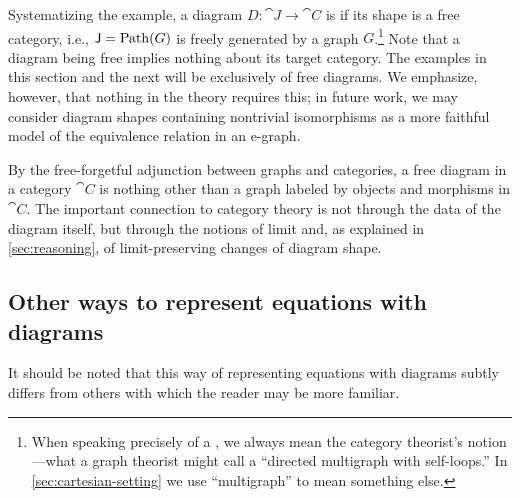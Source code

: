 \documentclass[11pt]{article}
\numberwithin{equation}{section}
\begin{document}
Systematizing the example, a diagram $D: \cat{J} \to \cat{C}$ is 
if its shape is a free category, i.e., $\mathsf{J} = \operatorname{Path}(G)$ is freely generated
by a graph $G$.\footnote{When speaking precisely of a , we always
  mean the category theorist's notion---what a graph theorist might call a
  ``directed multigraph with self-loops.'' In \cref{sec:cartesian-setting} we
  use ``multigraph'' to mean something else.} Note that a diagram being free
implies nothing about its target category. The examples in this section and the
next will be exclusively of free diagrams. We emphasize, however, that nothing
in the theory requires this; in future work, we may consider diagram shapes
containing nontrivial isomorphisms as a more faithful model of the equivalence
relation in an e-graph.

By the free-forgetful adjunction between graphs and categories, a free diagram
in a category $\cat{C}$ is nothing other than a graph labeled by objects and
morphisms in $\cat{C}$. The important connection to category theory is not
through the data of the diagram itself, but through the notions of limit and, as
explained in \cref{sec:reasoning}, of limit-preserving changes of diagram shape.

\subsection{Other ways to represent equations with diagrams}

It should be noted that this way of representing equations with diagrams subtly
differs from others with which the reader may be more familiar.
\end{document}
